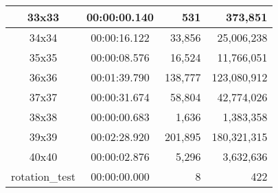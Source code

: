 \begin{center}
\begin{tabular}{|c|c|r|r|}
		33x33 & 00:00:00.140 & 531 & 373,851 \\ \hline
		34x34 & 00:00:16.122 & 33,856 & 25,006,238 \\ \hline
		35x35 & 00:00:08.576 & 16,524 & 11,766,051 \\ \hline
		36x36 & 00:01:39.790 & 138,777 & 123,080,912 \\ \hline
		37x37 & 00:00:31.674 & 58,804 & 42,774,026 \\ \hline
		38x38 & 00:00:00.683 & 1,636 & 1,383,358 \\ \hline
		39x39 & 00:02:28.920 & 201,895 & 180,321,315 \\ \hline
		40x40 & 00:00:02.876 & 5,296 & 3,632,636 \\ \hline
		rotation\_test & 00:00:00.000 & 8 & 422 \\ \hline

    \end{tabular}
\end{center}
